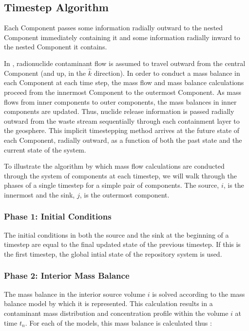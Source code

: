 \subsection{Timestep Algorithm}\label{sec:timestepping}

Each Component passes some information radially outward to the nested 
Component immediately containing it and some information radially 
inward to the nested Component it contains. 

In \Cyder, radionuclide contaminant flow is assumed to travel outward from 
the central Component (and up, in the $\hat{k}$ direction). In order to conduct 
a mass balance in each Component at each time step, the mass flow and mass 
balance calculations proceed from the innermost Component to the outermost 
Component. As mass flows from inner components to outer components, the mass 
balances in inner components are updated.  Thus, nuclide release information is 
passed radially outward from the waste stream sequentially through each 
containment layer to the geosphere.  This implicit timestepping method 
arrives at the future state of each Component, radially outward, as a function 
of both the past state and the current state of the system. 


To illustrate the algorithm by which mass flow calculations are conducted 
through the system of components at each timestep, we will walk through the 
phases of a single timestep for a simple pair of components. The source, $i$, 
is the innermost and the sink, $j$, is the outermost component. 

\subsubsection{Phase 1: Initial Conditions}

The initial conditions in both the source and the sink at the beginning of a 
timestep are equal to the final updated state of the previous timestep. If this 
is the first timestep, the global intial state of the repository system is used. 

\subsubsection{Phase 2: Interior Mass Balance}

The mass balance in the interior source volume $i$ is solved according to the mass 
balance model by which it is represented. This calculation results in a 
contaminant mass distribution and concentration profile within the volume $i$ 
at time $t_n$. 
For each of the models, this mass balance is calculated thus :


